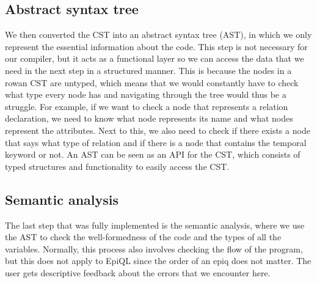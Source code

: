 \subsection{Abstract syntax tree}
\label{subsec:ast}
We then converted the CST into an abstract syntax tree (AST), in which we only represent the essential information about the code. This step is not necessary for our compiler, but it acts as a functional layer so we can access the data that we need in the next step in a structured manner. This is because the nodes in a rowan CST are untyped, which means that we would constantly have to check what type every node has and navigating through the tree would thus be a struggle. For example, if we want to check a node that represents a relation declaration, we need to know what node represents its name and what nodes represent the attributes. Next to this, we also need to check if there exists a node that says what type of relation and if there is a node that contains the temporal keyword or not. An AST can be seen as an API for the CST, which consists of typed structures and functionality to easily access the CST.

\subsection{Semantic analysis}
\label{subsec:semantic_analysis}
The last step that was fully implemented is the semantic analysis, where we use the AST to check the well-formedness of the code and the types of all the variables. Normally, this process also involves checking the flow of the program, but this does not apply to EpiQL since the order of an epiq does not matter. The user gets descriptive feedback about the errors that we encounter here.

